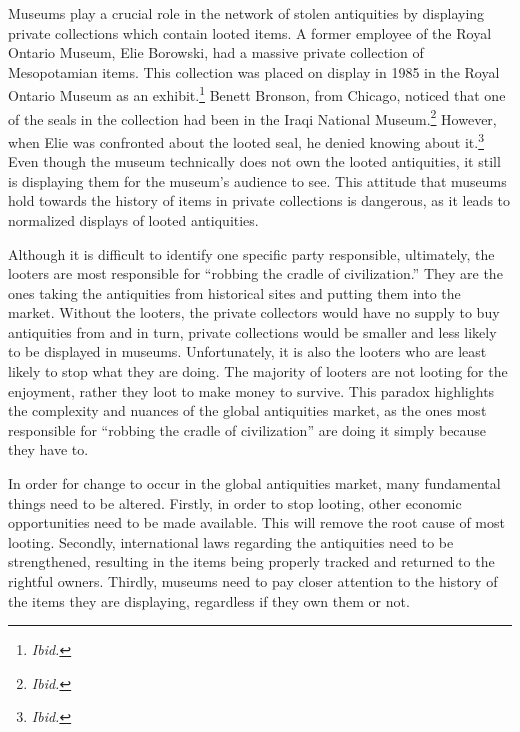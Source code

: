 \documentclass[11pt]{article}
\begin{document}
Museums play a crucial role in the network of stolen antiquities by displaying private collections which contain looted items. A former employee of the Royal Ontario Museum, Elie Borowski, had a massive private collection of Mesopotamian items. This collection was placed on display in 1985 in the Royal Ontario Museum as an exhibit.\footnote{\textit{Ibid.}} Benett Bronson, from Chicago, noticed that one of the seals in the collection had been in the Iraqi National Museum.\footnote{\textit{Ibid.}} However, when Elie was confronted about the looted seal, he denied knowing about it.\footnote{\textit{Ibid.}} Even though the museum technically does not own the looted antiquities, it still is displaying them for the museum's audience to see. This attitude that museums hold towards the history of items in private collections is dangerous, as it leads to normalized displays of looted antiquities.

Although it is difficult to identify one specific party responsible, ultimately, the looters are most responsible for ``robbing the cradle of civilization.'' They are the ones taking the antiquities from historical sites and putting them into the market. Without the looters, the private collectors would have no supply to buy antiquities from and in turn, private collections would be smaller and less likely to be displayed in museums. Unfortunately, it is also the looters who are least likely to stop what they are doing. The majority of looters are not looting for the enjoyment, rather they loot to make money to survive. This paradox highlights the complexity and nuances of the global antiquities market, as the ones most responsible for ``robbing the cradle of civilization'' are doing it simply because they have to.

In order for change to occur in the global antiquities market, many fundamental things need to be altered. Firstly, in order to stop looting, other economic opportunities need to be made available. This will remove the root cause of most looting. Secondly, international laws regarding the antiquities need to be strengthened, resulting in the items being properly tracked and returned to the rightful owners. Thirdly, museums need to pay closer attention to the history of the items they are displaying, regardless if they own them or not.
\end{document}
